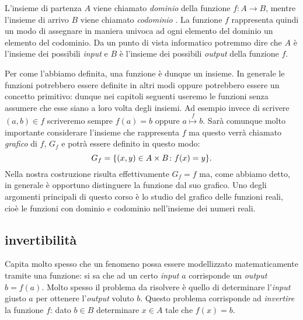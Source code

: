 L'insieme di partenza $A$ viene chiamato \emph{dominio}%
%
della funzione $f\colon A\to B$,
mentre l'insieme di arrivo $B$ viene chiamato \emph{codominio}%
%
.
La funzione $f$ rappresenta quindi un modo di assegnare in maniera univoca
ad ogni elemento del dominio un elemento del codominio.
Da un punto di vista informatico potremmo dire che $A$ è l'insieme
dei possibili \emph{input} e $B$ è l'insieme dei possibili \emph{output}
della funzione $f$.

Per come l'abbiamo definita, una funzione è dunque un insieme.
In generale le funzioni potrebbero essere definite in altri modi oppure 
potrebbero essere un concetto primitivo: dunque nei capitoli seguenti useremo le funzioni 
senza assumere che esse siano a loro volta degli insiemi.
Ad esempio invece di scrivere $(a,b)\in f$ scriveremo sempre $f(a)=b$ 
oppure $a\stackrel f \mapsto b$.
Sarà comunque molto importante
considerare l'insieme che rappresenta $f$ ma questo verrà chiamato
\emph{grafico}%
%
 di $f$, $G_f$ e potrà essere definito in questo modo:
\[
  G_f = {\left\{ (x,y)\in A \times B\colon f(x)=y \right\}}.
\]
Nella nostra costruzione risulta effettivamente $G_f = f$ ma, come abbiamo detto,
in generale è opportuno distinguere la funzione dal suo grafico.
Uno degli argomenti principali di questo corso è lo studio 
del grafico delle funzioni reali, cioè le funzioni 
con dominio e codominio nell'insieme dei numeri reali.

\subsection{invertibilità}

Capita molto spesso che un fenomeno possa essere modellizzato matematicamente
tramite una funzione: si sa che ad un certo \emph{input} $a$ corrisponde
un \emph{output} $b=f(a)$. Molto spesso il problema da risolvere è
quello di determinare l'\emph{input} giusto $a$ per ottenere l'\emph{output}
voluto $b$. Questo problema corrisponde ad \emph{invertire} la funzione $f$:
dato $b\in B$ determinare $x\in A$ tale che $f(x) = b$.

